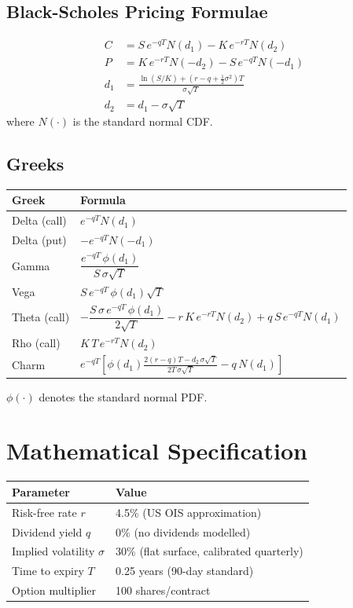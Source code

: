 \documentclass{apex_mdd}
\begin{document}
\subsection{Black-Scholes Pricing Formulae}
\begin{formulabox}
\begin{align*}
  C &= S\,e^{-qT} N(d_1) - K\,e^{-rT} N(d_2)\\
  P &= K\,e^{-rT} N(-d_2) - S\,e^{-qT} N(-d_1)\\[6pt]
  d_1 &= \frac{\ln(S/K) + (r - q + \tfrac{1}{2}\sigma^2)T}{\sigma\sqrt{T}}\\
  d_2 &= d_1 - \sigma\sqrt{T}
\end{align*}
where $N(\cdot)$ is the standard normal CDF.
\end{formulabox}

\subsection{Greeks}
\begin{center}
\small
\begin{tabular}{ll}
\toprule
\textbf{Greek} & \textbf{Formula} \\
\midrule
Delta (call)  & $e^{-qT} N(d_1)$ \\
Delta (put)   & $-e^{-qT} N(-d_1)$ \\
Gamma         & $\dfrac{e^{-qT}\,\phi(d_1)}{S\,\sigma\sqrt{T}}$ \\[8pt]
Vega          & $S\,e^{-qT}\,\phi(d_1)\sqrt{T}$ \\
Theta (call)  & $-\dfrac{S\,\sigma\,e^{-qT}\,\phi(d_1)}{2\sqrt{T}} - r\,K\,e^{-rT} N(d_2) + q\,S\,e^{-qT} N(d_1)$ \\[8pt]
Rho (call)    & $K\,T\,e^{-rT} N(d_2)$ \\
Charm         & $e^{-qT}\!\left[\phi(d_1)\frac{2(r-q)T - d_2\,\sigma\sqrt{T}}{2T\,\sigma\sqrt{T}} - q\,N(d_1)\right]$ \\
\bottomrule
\end{tabular}
\end{center}
$\phi(\cdot)$ denotes the standard normal PDF.

\section{Mathematical Specification}

\begin{center}
\small
\begin{tabular}{ll}
\toprule
\textbf{Parameter} & \textbf{Value} \\
\midrule
Risk-free rate $r$      & 4.5\% (US OIS approximation) \\
Dividend yield $q$      & 0\% (no dividends modelled) \\
Implied volatility $\sigma$ & 30\% (flat surface, calibrated quarterly) \\
Time to expiry $T$      & 0.25 years (90-day standard) \\
Option multiplier       & 100 shares/contract \\
\bottomrule
\end{tabular}
\end{center}
\end{document}
